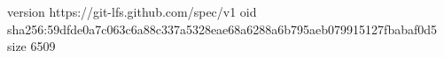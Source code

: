 version https://git-lfs.github.com/spec/v1
oid sha256:59dfde0a7c063c6a88c337a5328eae68a6288a6b795aeb079915127fbabaf0d5
size 6509
